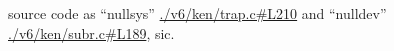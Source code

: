 source code as ``nullsys'' \url{./v6/ken/trap.c#L210} and
``nulldev'' \url{./v6/ken/subr.c#L189}, sic.